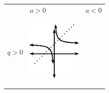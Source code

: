 \setlength\mytablespace{6\tabcolsep}
\addtolength\mytablespace{4\arrayrulewidth}
\setlength\mytablewidth{\linewidth}
\setlength\mytableroom{\mytablewidth}
\addtolength\mytableroom{-\mytablespace}
\setlength\myfixedwidth{0pt}
\setlength\mystarwidth{\mytableroom}
\addtolength\mystarwidth{-\myfixedwidth}
\divide{}
\begin{center}
\label{m39341*uid151}
\noindent
{}
\tablelasttail{}
\begin{xtabular*}{\mytablewidth}[t]{|p{10\mystarwidth}|p{10\mystarwidth}|p{10\mystarwidth}|}\hline
&
    $a>0$
    &
    $a<0$
\tabularnewline{}
    $q>0$
    &
\setcounter{subfigure}{0}
\label{m39341*id246931}
\begin{center}
\label{m39341*id246931!!!underscore!!!media}\label{m39341*id246931!!!underscore!!!printimage}\includegraphics[width=100px]{col11306.imgs/m39341_MG10C11_022.png} %
\vspace{2pt}
\vspace{.1in}

\end{center}
\end{xtabular*}
\end{center}
